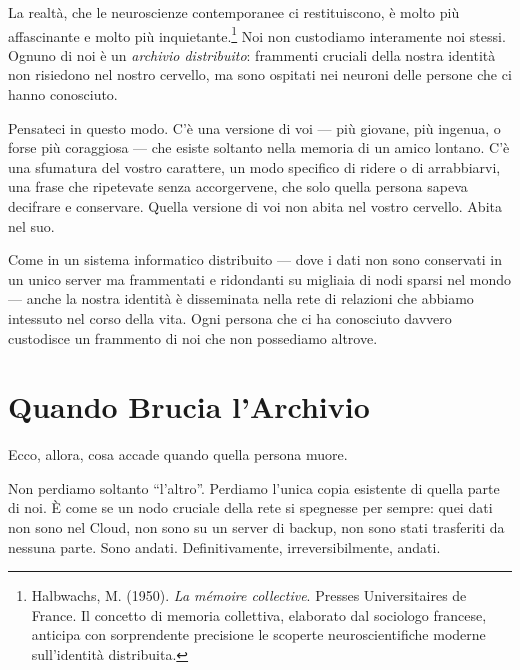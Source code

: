 La realtà, che le neuroscienze contemporanee ci restituiscono, è molto più affascinante e molto più inquietante.\footnote{Halbwachs, M. (1950). \textit{La mémoire collective}. Presses Universitaires de France. Il concetto di memoria collettiva, elaborato dal sociologo francese, anticipa con sorprendente precisione le scoperte neuroscientifiche moderne sull'identità distribuita.} Noi non custodiamo interamente noi stessi. Ognuno di noi è un \emph{archivio distribuito}: frammenti cruciali della nostra identità non risiedono nel nostro cervello, ma sono ospitati nei neuroni delle persone che ci hanno conosciuto.

Pensateci in questo modo. C'è una versione di voi --- più giovane, più ingenua, o forse più coraggiosa --- che esiste soltanto nella memoria di un amico lontano. C'è una sfumatura del vostro carattere, un modo specifico di ridere o di arrabbiarvi, una frase che ripetevate senza accorgervene, che solo quella persona sapeva decifrare e conservare. Quella versione di voi non abita nel vostro cervello. Abita nel suo.

Come in un sistema informatico distribuito --- dove i dati non sono conservati in un unico server ma frammentati e ridondanti su migliaia di nodi sparsi nel mondo --- anche la nostra identità è disseminata nella rete di relazioni che abbiamo intessuto nel corso della vita. Ogni persona che ci ha conosciuto davvero custodisce un frammento di noi che non possediamo altrove.

\begin{center}
	\label{fig:neuroni_memoria}
\end{center}

\section{Quando Brucia l'Archivio}

Ecco, allora, cosa accade quando quella persona muore.

Non perdiamo soltanto ``l'altro''. Perdiamo l'unica copia esistente di quella parte di noi. È come se un nodo cruciale della rete si spegnesse per sempre: quei dati non sono nel Cloud, non sono su un server di backup, non sono stati trasferiti da nessuna parte. Sono andati. Definitivamente, irreversibilmente, andati.

